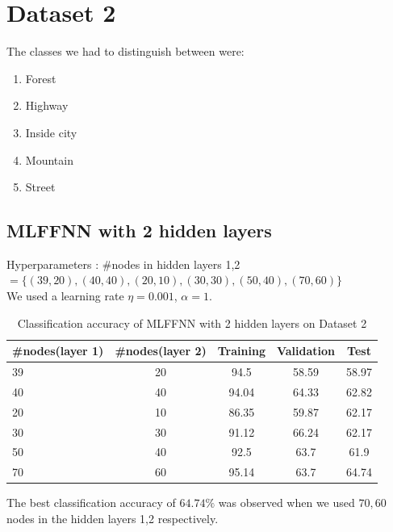\documentclass[11pt]{article}
\begin{document}
\newpage

\section{Dataset 2}

The classes we had to distinguish between were:
\begin{enumerate}
\item Forest
\item Highway
\item Inside city
\item Mountain
\item Street
\end{enumerate}

\subsection{MLFFNN with 2 hidden layers}

Hyperparameters : \#nodes in hidden layers 1,2 $= \{(39,20), (40,40), (20,10), (30,30), (50,40),(70,60)\}$\\

 We used a learning rate $\eta = 0.001$, $\alpha = 1$. 
\begin{table}[h!]
\label{tab:tab3.1.1}
\begin{center}
\begin{tabular}{|l|c|c|c|c|}
\hline
\textbf{\#nodes(layer 1)} & \textbf{\#nodes(layer 2)} & \textbf{Training} & \textbf{Validation} &\textbf{Test}\\
\hline
39 & 20 &  94.5 & 58.59 & 58.97\\
\hline
40 & 40 & 94.04 & 64.33 & 62.82\\
\hline
20 & 10 & 86.35 & 59.87 & 62.17\\
\hline
30 & 30 & 91.12 & 66.24 & 62.17\\
\hline
50 & 40 & 92.5 & 63.7 & 61.9\\ 
\hline
70 & 60 & 95.14 & 63.7 & 64.74\\ 
\hline
\end{tabular}
\caption{Classification accuracy of MLFFNN with 2 hidden layers on Dataset 2}
\end{center}
\end{table}

The best classification accuracy of $64.74\%$ was observed when we used $70,60$ nodes in the hidden layers 1,2 respectively.
\end{document}
